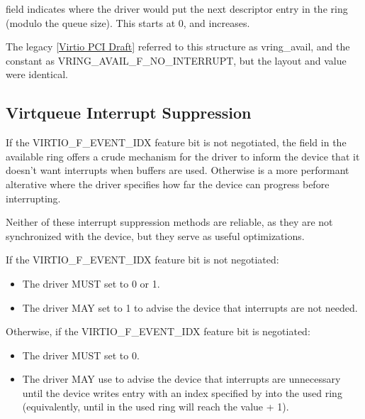  field indicates where the driver would put the next descriptor
entry in the ring (modulo the queue size). This starts at 0, and increases.

\begin{note}
The legacy \hyperref[intro:Virtio PCI Draft]{[Virtio PCI Draft]}
referred to this structure as vring_avail, and the constant as
VRING_AVAIL_F_NO_INTERRUPT, but the layout and value were identical.
\end{note}

\subsection{Virtqueue Interrupt Suppression}\label{sec:Basic Facilities of a Virtio Device / Virtqueues / Virtqueue Interrupt Suppression}

If the VIRTIO_F_EVENT_IDX feature bit is not negotiated,
the  field in the available ring offers a crude mechanism for the driver to inform
the device that it doesn't want interrupts when buffers are used.  Otherwise
 is a more performant alterative where the driver
specifies how far the device can progress before interrupting.

Neither of these interrupt suppression methods are reliable, as they
are not synchronized with the device, but they serve as
useful optimizations.

If the VIRTIO_F_EVENT_IDX feature bit is not negotiated:
\begin{itemize}
\item The driver MUST set  to 0 or 1.
\item The driver MAY set  to 1 to advise
the device that interrupts are not needed.
\end{itemize}

Otherwise, if the VIRTIO_F_EVENT_IDX feature bit is negotiated:
\begin{itemize}
\item The driver MUST set  to 0.
\item The driver MAY use  to advise the device that interrupts are unnecessary until the device writes entry with an index specified by  into the used ring (equivalently, until  in the
used ring will reach the value  + 1).
\end{itemize}

